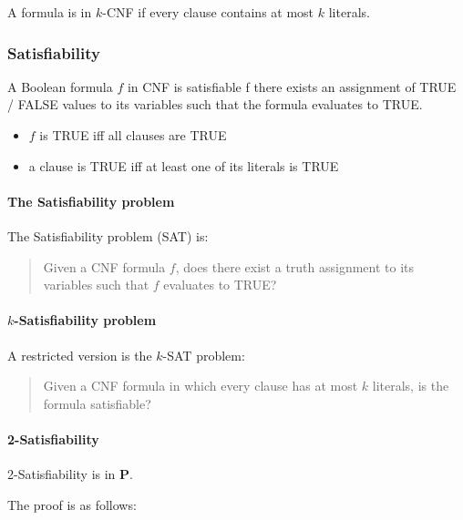 \documentclass[11pt]{article}
\providecommand{\tightlist}{%
      \setlength{\itemsep}{0pt}\setlength{\parskip}{0pt}}
\begin{document}
A formula is in \(k\)-CNF if every clause contains at most \(k\)
literals.

    \subsubsection{Satisfiability}\label{satisfiability}

A Boolean formula \(f\) in CNF is satisfiable f there exists an
assignment of TRUE / FALSE values to its variables such that the formula
evaluates to TRUE.

\begin{itemize}
\tightlist
\item
  \(f\) is TRUE iff all clauses are TRUE
\item
  a clause is TRUE iff at least one of its literals is TRUE
\end{itemize}

\paragraph{The Satisfiability problem}\label{the-satisfiability-problem}

The Satisfiability problem (SAT) is:

\begin{quote}
Given a CNF formula \(f\), does there exist a truth assignment to its
variables such that \(f\) evaluates to TRUE?
\end{quote}

\paragraph{\texorpdfstring{\(k\)-Satisfiability
problem}{k-Satisfiability problem}}\label{k-satisfiability-problem}

A restricted version is the \(k\)-SAT problem:

\begin{quote}
Given a CNF formula in which every clause has at most \(k\) literals, is
the formula satisfiable?
\end{quote}

    \paragraph{2-Satisfiability}\label{satisfiability}

2-Satisfiability is in \textbf{P}.

The proof is as follows:
\end{document}
